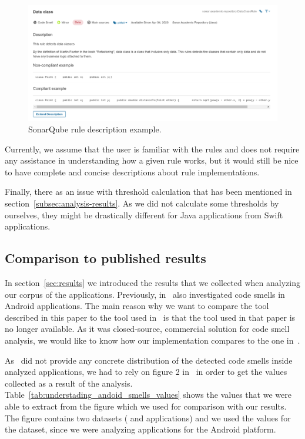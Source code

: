 \begin{figure}
    \includegraphics[scale=0.45]{figures/sonarqube_description.png}
    \caption{SonarQube rule description example.}
    \label{fig:sonarqube_description_example}
\end{figure}

Currently, we assume that the user is familiar with the rules and does not require any assistance in understanding how
a given rule works, but it would still be nice to have complete and concise descriptions about rule implementations.

Finally, there as an issue with threshold calculation that has been mentioned in section~\ref{subsec:analysis-results}.
As we did not calculate some thresholds by ourselves, they might be drastically different for Java applications from
Swift applications.

\FloatBarrier

\subsection{Comparison to published results}\label{subsec:comparison-to-published-results}

In section~\ref{sec:results} we introduced the results that we collected when analyzing our corpus
of the applications.
Previously, \citeauthor{mannan2016understanding} in~\cite{mannan2016understanding} also investigated code smells in
Android applications.
The main reason why we want to compare the tool described in this paper to the tool used in~\cite{mannan2016understanding}
is that the tool used in that paper is no longer available.
As it was closed-source, commercial solution for code smell analysis, we would like to know how our implementation
compares to the one in~\cite{mannan2016understanding}.

As~\citeauthor{mannan2016understanding} did not provide any concrete distribution of the detected
code smells inside analyzed applications, we had to rely on figure 2 in~\cite{mannan2016understanding} in order
to get the values collected as a result of the analysis.
Table~\ref{tab:understading_andoid_smells_values} shows the values that we were able to extract from the figure which we used for comparison
with our results.
The figure contains two datasets ( and  applications) and we used the values for the 
dataset, since we were analyzing applications for the Android platform.

